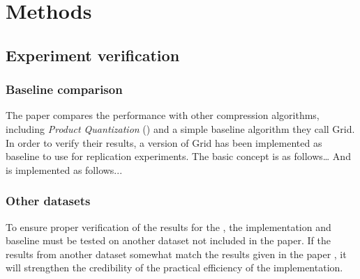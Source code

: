 \section{Methods}
\label{methods}

\subsection{Experiment verification}
\subsubsection{Baseline comparison}
The paper compares the \qs{} performance with other compression algorithms, including \textit{Product Quantization} (\pq{}) and a simple baseline algorithm they call Grid. In order to verify their results, a version of Grid has been implemented as baseline to use for replication experiments. The basic concept is as follows… And is implemented as follows...

\subsubsection{Other datasets}
To ensure proper verification of the results for the \qs{}, the implementation and baseline must be tested on another dataset not included in the paper. If the results from another dataset somewhat match the results given in the paper \cite{wagner17}, it will strengthen the credibility of the practical efficiency of the \qs{} implementation.
\\
\\
